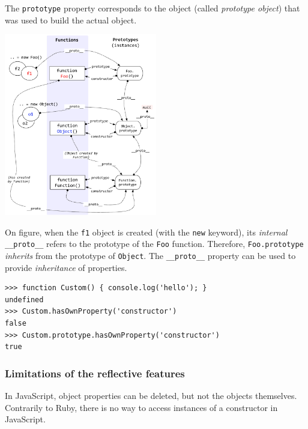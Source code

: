 \documentclass[a4paper,10pt]{article}
\begin{document}
The \lstinline|prototype| property corresponds to the object (called \textit{prototype object}) that was used to build the actual object.

    \begin{center}
    \includegraphics[width=0.5\textwidth]{jstypes.png}
    \end{center}

On figure, when the \lstinline|f1| object is created (with the \lstinline|new| keyword), its \textit{internal} \lstinline|__proto__| refers to the prototype of the \lstinline|Foo| function.
Therefore, \lstinline|Foo.prototype| \textit{inherits} from the prototype of \lstinline|Object|.
The \lstinline|__proto__| property can be used to provide \textit{inheritance} of properties.

\begin{lstlisting}
>>> function Custom() { console.log('hello'); }
undefined
>>> Custom.hasOwnProperty('constructor')
false
>>> Custom.prototype.hasOwnProperty('constructor')
true
\end{lstlisting}


\subsubsection{Limitations of the reflective features}

In JavaScript, object properties can be deleted, but not the objects themselves.
Contrarily to Ruby, there is no way to access instances of a constructor in JavaScript.
\end{document}
